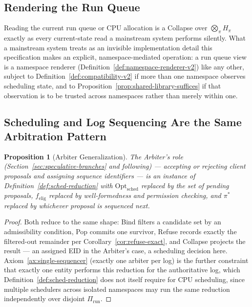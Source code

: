 \documentclass[11pt]{article}
\newtheorem{proposition}{Proposition}[section]
\begin{document}
\subsection{Rendering the Run Queue}

Reading the current run queue or CPU allocation is a Collapse over $\bigotimes_\pi H_\pi$ exactly as every current-state read a mainstream system performs silently. What a mainstream system treats as an invisible implementation detail this specification makes an explicit, namespace-mediated operation: a run queue view is a namespace renderer (Definition~\ref{def:namespace-renderer-v2}) like any other, subject to Definition~\ref{def:compatibility-v2} if more than one namespace observes scheduling state, and to Proposition~\ref{prop:shared-library-suffices} if that observation is to be trusted across namespaces rather than merely within one.

\subsection{Scheduling and Log Sequencing Are the Same Arbitration Pattern}

\begin{proposition}[Arbiter Generalization]
\label{prop:arbiter-generalization}
The Arbiter's role (Section~\ref{sec:speculative-branches} and following) --- accepting or rejecting client proposals and assigning sequence identifiers --- is an instance of Definition~\ref{def:sched-reduction} with $\mathrm{Opt}_{\mathrm{sched}}$ replaced by the set of pending proposals, $f_{\mathrm{elig}}$ replaced by well-formedness and permission checking, and $\pi^*$ replaced by whichever proposal is sequenced next.
\end{proposition}
\begin{proof}
Both reduce to the same shape: Bind filters a candidate set by an admissibility condition, Pop commits one survivor, Refuse records exactly the filtered-out remainder per Corollary~\ref{cor:refuse-exact}, and Collapse projects the result --- an assigned EID in the Arbiter's case, a scheduling decision here. Axiom~\ref{ax:single-sequencer} (exactly one arbiter per log) is the further constraint that exactly one entity performs this reduction for the authoritative log, which Definition~\ref{def:sched-reduction} does not itself require for CPU scheduling, since multiple schedulers across isolated namespaces may run the same reduction independently over disjoint $\Pi_{\mathrm{run}}$.
\end{proof}
\end{document}
